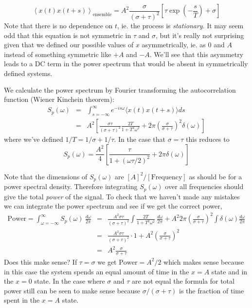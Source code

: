 \documentclass{article}
\newcommand{\avg}[1]{\left \langle #1 \right \rangle}
\begin{document}
\begin{equation*}
  \avg{x(t)x(t+s)}_{\textrm{ensemble}} = A^{2}\frac{\sigma}{(\sigma+\tau)^{2}}\left[\tau\exp\left(-\frac{s}{T}\right)+\sigma\right]
\end{equation*}
Note that there is no dependence on $t$, ie. the process is \emph{stationary}.
It may seem odd that this equation is not symmetric in $\tau$ and $\sigma$, but it's really not surprising given that we defined our possible values of $x$ asymmetrically, ie. as $0$ and $A$ instead of something symmetric like $+A$ and $-A$.
We'll see that this asymmetry leads to a DC term in the power spectrum that would be absent in symmetrically defined systems.

We calculate the power spectrum by Fourier transforming the autocorrelation function (Wiener Kinchein theorem):
\begin{eqnarray*}
  S_{p}(\omega) & = & \int_{s=-\infty}^{\infty}e^{-is\omega}\langle x(t)x(t+s)\rangle ds\\
                & = & A^{2}\left[\frac{\sigma\tau}{(\sigma+\tau)^{2}}\frac{2T}{1+T^{2}\omega^{2}}+2\pi\left(\frac{\sigma}{\sigma+\tau}\right)^{2}\delta(\omega)\right]
\end{eqnarray*}
where we've defined $1/T=1/\sigma+1/\tau$.
In the case that $\sigma=\tau$ this reduces to
\begin{equation*}
  S_p (\omega)=\frac{A^{2}}{4}\left[\frac{\tau}{1+(\omega\tau/2)^{2}}+2\pi\delta(\omega)\right]
\end{equation*}

Note that the dimensions of $S_{p}(\omega)$ are $[A]^{2}/[\textrm{Frequency}]$ as should be for a power spectral density.
Therefore integrating $S_{p}(\omega)$ over all frequencies should give the total \emph{power} of the signal.
To check that we haven't made any mistakes we can integrate the power spectrum and see if we get the correct power,
\begin{eqnarray*}
  \textrm{Power}=\int_{\omega=-\infty}^{\infty}S_{p}(\omega)~\frac{d\omega}{2\pi}
  & = & \frac{A^{2}\sigma\tau}{(\sigma+\tau)^{2}}\int\frac{2T}{1+T^{2}\omega^{2}}~\frac{d\omega}{2\pi}+A^{2}2\pi\left(\frac{\sigma}{\sigma+\tau}\right)^{2}\int\delta(\omega)\frac{d\omega}{2\pi}\\
  & = & \frac{A^{2}\sigma\tau}{(\sigma+\tau)^{2}}\cdot1+A^{2}\left(\frac{\sigma}{\sigma+\tau}\right)^{2}\\
  & = & A^{2}\frac{\sigma}{\sigma+\tau}
\end{eqnarray*}
Does this make sense? If $\tau=\sigma$ we get $\textrm{Power}=A^{2}/2$ which makes sense because in this case the system spends an equal amount of time in the $x=A$ state and in the $x=0$ state.
In the case where $\sigma$ and $\tau$ are not equal the formula for total power still can be seen to make sense because $\sigma/(\sigma+\tau)$ is the fraction of time spent in the $x=A$ state.
\end{document}
